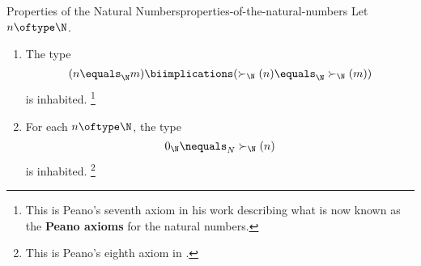 \begin{proposition}{Properties of the Natural Numbers}{properties-of-the-natural-numbers}%
    Let $n\oftype\N$.
    \begin{enumerate}
        \item\label{properties-of-the-natural-numbers-successors-and-equality}The type
            \[
                (n\equals_{\N}m)%
                \biimplications%
                (\succ_{\N}(n)\equals_{\N}\succ_{\N}(m))%
            \]%
            is inhabited.%
            \footnote{%
                This is Peano's seventh axiom in his work \cite{peano-book} describing what is now known as the \textbf{Peano axioms} for the natural numbers.
                \par\vspace*{\TCBBoxCorrection}
            }%
        \item\label{properties-of-the-natural-numbers-zero-is-not-a-successor}For each $n\oftype\N$, the type
            \[
                0_{\N}%
                \nequals_{N}%
                \succ_{\N}(n)%
            \]%
            is inhabited.%
            \footnote{%
                This is Peano's eighth axiom in \cite{peano-book}.
                \par\vspace*{\TCBBoxCorrection}
            }%
    \end{enumerate}
\end{proposition}
